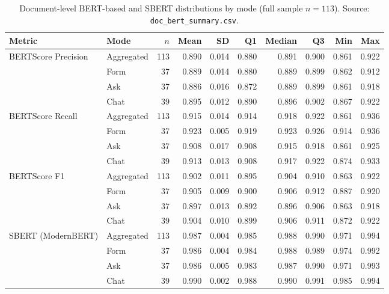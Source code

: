 \begin{table}
\centering
\caption{Document-level BERT-based and SBERT distributions by mode
(full sample $n = 113$). Source: \texttt{doc\_bert\_summary.csv}.}
\label{tab:nlp-doc-distrib-bert}
\small
\begin{tabular}{@{}l l r r r r r r r r@{}}
\toprule
Metric & Mode & $n$ & Mean & SD & Q1 & Median & Q3 & Min & Max \\
\midrule
\multirow{4}{*}{BERTScore Precision} & Aggregated  & 113 & 0.890 & 0.014 & 0.880 & 0.891 & 0.900 & 0.861 & 0.922 \\
                                     & Form & 37  & 0.889 & 0.014 & 0.880 & 0.889 & 0.899 & 0.862 & 0.912 \\
                                     & Ask  & 37  & 0.886 & 0.016 & 0.872 & 0.889 & 0.899 & 0.861 & 0.918 \\
                                     & Chat & 39  & 0.895 & 0.012 & 0.890 & 0.896 & 0.902 & 0.867 & 0.922 \\
\midrule
\multirow{4}{*}{BERTScore Recall}    & Aggregated  & 113 & 0.915 & 0.014 & 0.914 & 0.918 & 0.922 & 0.861 & 0.936 \\
                                     & Form & 37  & 0.923 & 0.005 & 0.919 & 0.923 & 0.926 & 0.914 & 0.936 \\
                                     & Ask  & 37  & 0.908 & 0.017 & 0.908 & 0.915 & 0.918 & 0.861 & 0.925 \\
                                     & Chat & 39  & 0.913 & 0.013 & 0.908 & 0.917 & 0.922 & 0.874 & 0.933 \\
\midrule
\multirow{4}{*}{BERTScore F1}        & Aggregated  & 113 & 0.902 & 0.011 & 0.895 & 0.904 & 0.910 & 0.863 & 0.922 \\
                                     & Form & 37  & 0.905 & 0.009 & 0.900 & 0.906 & 0.912 & 0.887 & 0.920 \\
                                     & Ask  & 37  & 0.897 & 0.013 & 0.892 & 0.896 & 0.906 & 0.863 & 0.918 \\
                                     & Chat & 39  & 0.904 & 0.010 & 0.899 & 0.906 & 0.911 & 0.872 & 0.922 \\
\midrule
\multirow{4}{*}{SBERT (ModernBERT)}  & Aggregated  & 113 & 0.987 & 0.004 & 0.985 & 0.988 & 0.990 & 0.971 & 0.994 \\
                                     & Form & 37  & 0.986 & 0.004 & 0.984 & 0.988 & 0.989 & 0.974 & 0.992 \\
                                     & Ask  & 37  & 0.986 & 0.005 & 0.983 & 0.987 & 0.990 & 0.971 & 0.993 \\
                                     & Chat & 39  & 0.990 & 0.002 & 0.988 & 0.990 & 0.991 & 0.985 & 0.994 \\
\bottomrule
\end{tabular}
\end{table}


